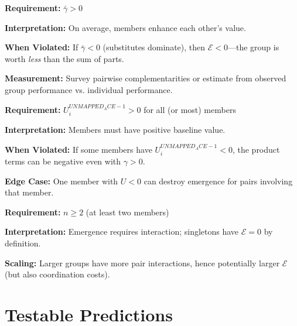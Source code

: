 \begin{tcolorbox}[colback=gray!5!white, colframe=gray!75!black,
    title=LET Condition 1: Positive Average Complementarity]

\textbf{Requirement:} $\bar{\gamma} > 0$

\textbf{Interpretation:} On average, members enhance each other's value.

\textbf{When Violated:} If $\bar{\gamma} < 0$ (substitutes dominate), then
$\mathcal{E} < 0$---the group is worth \textit{less} than the sum of parts.

\textbf{Measurement:} Survey pairwise complementarities or estimate from
observed group performance vs. individual performance.
\end{tcolorbox}

\begin{tcolorbox}[colback=gray!5!white, colframe=gray!75!black,
    title=LET Condition 2: Positive Base Utilities]

\textbf{Requirement:} $U^{UNMAPPED_ACE-1}_i > 0$ for all (or most) members

\textbf{Interpretation:} Members must have positive baseline value.

\textbf{When Violated:} If some members have $U^{UNMAPPED_ACE-1}_i < 0$, the product
terms can be negative even with $\gamma > 0$.

\textbf{Edge Case:} One member with $U < 0$ can destroy emergence for
pairs involving that member.
\end{tcolorbox}

\begin{tcolorbox}[colback=gray!5!white, colframe=gray!75!black,
    title=LET Condition 3: Non-Degenerate Group]

\textbf{Requirement:} $n \geq 2$ (at least two members)

\textbf{Interpretation:} Emergence requires interaction; singletons have
$\mathcal{E} = 0$ by definition.

\textbf{Scaling:} Larger groups have more pair interactions, hence
potentially larger $\mathcal{E}$ (but also coordination costs).
\end{tcolorbox}


\section{Testable Predictions}
\label{sec:let-predictions}

